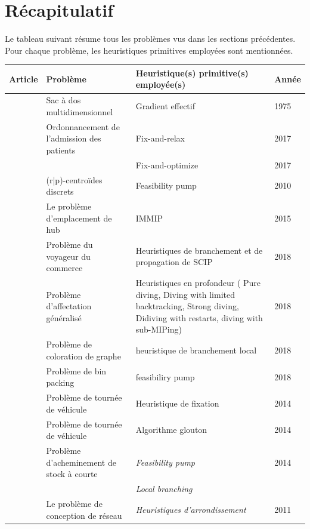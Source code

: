 \documentclass[12pt,a4paper,oneside]{book}
\theoremstyle{definition}
\begin{document}
	\section{Récapitulatif}
	Le tableau suivant résume tous les problèmes vus dans les sections précédentes. Pour chaque problème, les heuristiques primitives employées sont mentionnées.
	    \begin{center}
                \begin{tabularx}{1\textwidth}{|X|X|X|X|}
                    \hline
                    Article & Problème & Heuristique(s) primitive(s) employée(s) & Année\\ 
                    \hline
                    \hline
                    \cite{Toyoda1975} & Sac à dos multidimensionnel & Gradient effectif & 1975\\  \hline
                    \cite{Turhan2017}& Ordonnancement de l'admission des patients & Fix-and-relax & 2017 \\
                    && Fix-and-optimize & 2017\\ \hline 
                    \cite{Alekseeva2010} & (r|p)-centroïdes discrets & Feasibility pump & 2010\\ \hline 
                    \cite{He2015} & Le problème d'emplacement de hub & IMMIP & 2015 \\ \hline
                    \cite{hansknecht2018cuts} & Problème du voyageur du commerce & Heuristiques de branchement et de propagation de SCIP & 2018  \\ \hline
                    \cite{sadykov2018primal} & Problème d'affectation généralisé & Heuristiques en profondeur ( Pure diving, Diving with limited backtracking, Strong diving, Didiving with restarts, diving with sub-MIPing) & 2018\\
                    &Problème de coloration de graphe& heuristique de branchement local & 2018\\
                    &Problème de bin packing& feasibiliry pump & 2018 \\ \hline
                     \cite{Cacchiani2014} & Problème de tournée de véhicule & Heuristique de fixation & 2014 \\ \hline
                     \cite{Bettinelli2014}& Problème de tournée de véhicule & Algorithme glouton & 2014 \\ \hline
                     \cite{Agra2014} & Problème d'acheminement de stock à courte & \textit{Feasibility pump} & 2014 \\
                     & &  \textit{Local branching} & \\ \hline
                     \cite{buchheim2011exact} & Le problème de conception de réseau & \textit{Heuristiques d'arrondissement} & 2011 \\ \hline
                    
            \end{tabularx}    
        \end{center}
        
\end{document}
